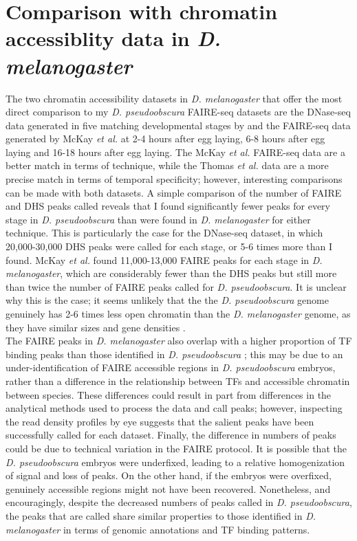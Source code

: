 \section{Comparison with chromatin accessiblity data in \emph{D. melanogaster}}
The two chromatin accessibility datasets in \emph{D. melanogaster} that offer the most direct comparison to my \emph{D. pseudoobscura} FAIRE-seq datasets are the DNase-seq data generated in five matching developmental stages by \citet{thomas_dynamic_2011} and the FAIRE-seq data generated by McKay \emph{et al.} \citep{mckay_common_2013} at 2-4 hours after egg laying, 6-8 hours after egg laying and 16-18 hours after egg laying. The McKay \emph{et al.} FAIRE-seq data are a better match in terms of technique, while the Thomas \emph{et al.} data are a more precise match in terms of temporal specificity; however, interesting comparisons can be made with both datasets. A simple comparison of the number of FAIRE and DHS peaks called reveals that I found significantly fewer peaks for every stage in \emph{D. pseudoobscura} than were found in \emph{D. melanogaster} for either technique. This is particularly the case for the DNase-seq dataset, in which 20,000-30,000 DHS peaks were called for each stage, or 5-6 times more than I found. McKay \emph{et al.} found 11,000-13,000 FAIRE peaks for each stage in \emph{D. melanogaster}, which are considerably fewer than the DHS peaks but still more than twice the number of FAIRE peaks called for \emph{D. pseudoobscura}. It is unclear why this is the case; it seems unlikely that the the \emph{D. pseudoobscura} genome genuinely has 2-6 times less open chromatin than the \emph{D. melanogaster} genome, as they have similar sizes and gene densities \citep{richards_comparative_2005}.\\ 

The FAIRE peaks in \emph{D. melanogaster} also overlap with a higher proportion of TF binding peaks than those identified in \emph{D. pseudoobscura} \citep{mckay_common_2013}; this may be due to an under-identification of FAIRE accessible regions in \emph{D. pseudoobscura} embryos, rather than a difference in the relationship between TFs and accessible chromatin between species. These differences could result in part from differences in the analytical methods used to process the data and call peaks; however, inspecting the read density profiles by eye suggests that the salient peaks have been successfully called for each dataset. Finally, the difference in numbers of peaks could be due to technical variation in the FAIRE protocol. It is possible that the \emph{D. pseudoobscura} embryos were underfixed, leading to a relative homogenization of signal and loss of peaks. On the other hand, if the embryos were overfixed, genuinely accessible regions might not have been recovered. Nonetheless, and encouragingly, despite the decreased numbers of peaks called in \emph{D. pseudoobscura}, the peaks that are called share similar properties to those identified in \emph{D. melanogaster} in terms of genomic annotations and TF binding patterns.\\

